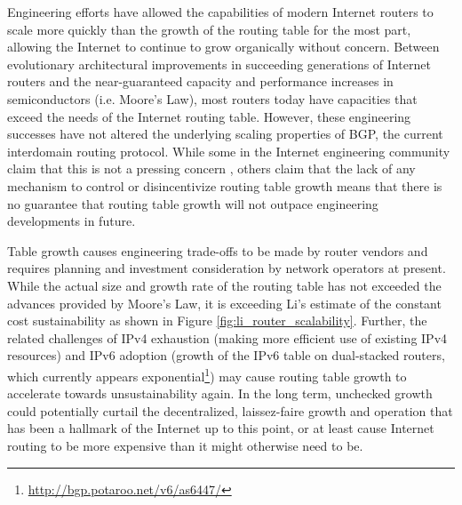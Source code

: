 


Engineering efforts have allowed the capabilities of modern Internet routers to scale more quickly than the growth of the routing table for the most part, allowing the Internet to continue to grow organically without concern. Between evolutionary architectural improvements in succeeding generations of Internet routers \cite{McKeown:2006kx} and the near-guaranteed capacity and performance increases in semiconductors (i.e. Moore's Law), most routers today have capacities that exceed the needs of the Internet routing table. However, these engineering successes have not altered the underlying scaling properties of BGP, the current interdomain routing protocol. While some in the Internet engineering community claim that this is not a pressing concern \cite{Huston:2011ys, Huston:2009dq}, others \cite{Li:2011vn} claim that the lack of any mechanism to control or disincentivize routing table growth means that there is no guarantee that routing table growth will not outpace engineering developments in future.

Table growth causes engineering trade-offs to be made by router vendors \cite{Li:2011vn} and requires planning and investment consideration by network operators \cite{Zhao:2010fu} at present. While the actual size and growth rate of the routing table has not exceeded the advances provided by Moore's Law, it is exceeding Li's estimate of the constant cost sustainability as shown in Figure \ref{fig:li_router_scalability}. Further, the related challenges of IPv4 exhaustion (making more efficient use of existing IPv4 resources) and IPv6 adoption (growth of the IPv6 table on dual-stacked routers, which currently appears exponential\footnote{\url{http://bgp.potaroo.net/v6/as6447/}}) may cause routing table growth to accelerate towards unsustainability again. In the long term, unchecked growth could potentially curtail the decentralized, laissez-faire growth and operation that has been a hallmark of the Internet up to this point, or at least cause Internet routing to be more expensive than it might otherwise need to be.

